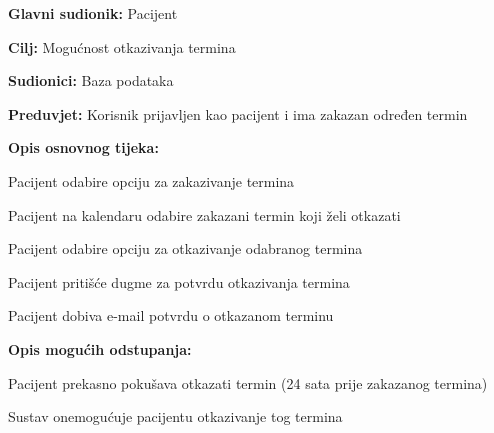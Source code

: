 					\noindent {}
					\begin{packed_item}
						
						\item \textbf{Glavni sudionik: }Pacijent
						\item  \textbf{Cilj:} Mogućnost otkazivanja termina 
						\item  \textbf{Sudionici:} Baza podataka
						\item  \textbf{Preduvjet:} Korisnik prijavljen kao pacijent i ima zakazan određen termin
						\item  \textbf{Opis osnovnog tijeka:}
						
						\item[] \begin{packed_enum}
							
							\item Pacijent odabire opciju za zakazivanje termina
							\item Pacijent na kalendaru odabire zakazani termin koji želi otkazati
							\item Pacijent odabire opciju za otkazivanje odabranog termina
							\item Pacijent pritišće dugme za potvrdu otkazivanja termina
							\item Pacijent dobiva e-mail potvrdu o otkazanom terminu
						\end{packed_enum}
						
						\item  \textbf{Opis mogućih odstupanja:}
						
						\item[] \begin{packed_item}
							
							\item[3.a] Pacijent prekasno pokušava otkazati termin (24 sata prije zakazanog termina)
							\item[] \begin{packed_enum}
								
								\item Sustav onemogućuje pacijentu otkazivanje tog termina
								
							\end{packed_enum}
							
						\end{packed_item}
					\end{packed_item}
					
